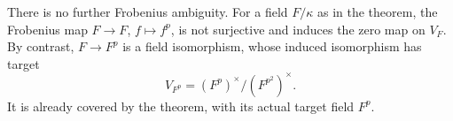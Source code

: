\begin{remark}
There is no further Frobenius ambiguity. For a field $F/\kappa$ as
in the theorem, the Frobenius map $F\to F$, $f\mapsto f^p$, is not
surjective and induces the zero map on $V_F$. By contrast,
$F\to F^p$ is a field isomorphism, whose induced isomorphism has target
\[
 V_{F^p}=(F^p)^\times/(F^{p^2})^\times.
\]
It is already covered by the theorem, with its actual target field
$F^p$.
\end{remark}
